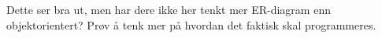 
Dette ser bra ut, men har dere ikke her tenkt mer ER-diagram enn objektorientert? Prøv å tenk mer på hvordan det faktisk skal programmeres.